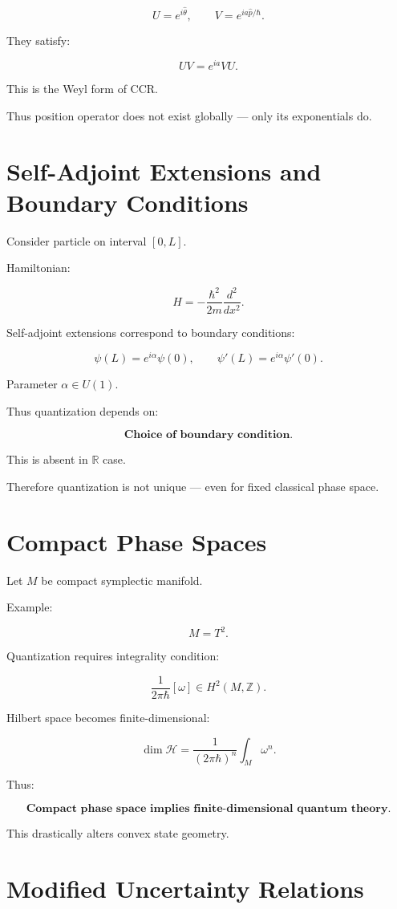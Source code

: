 \documentclass[11pt]{book}
\begin{document}
\[
U = e^{i\hat{\theta}},
\qquad
V = e^{i a \hat{p}/\hbar}.
\]

They satisfy:

\[
UV = e^{ia}VU.
\]

This is the Weyl form of CCR.

Thus position operator does not exist globally —
only its exponentials do.

\section{Self-Adjoint Extensions and Boundary Conditions}

Consider particle on interval $[0,L]$.

Hamiltonian:

\[
H = -\frac{\hbar^2}{2m}\frac{d^2}{dx^2}.
\]

Self-adjoint extensions correspond to boundary conditions:

\[
\psi(L) = e^{i\alpha}\psi(0),
\qquad
\psi'(L)=e^{i\alpha}\psi'(0).
\]

Parameter $\alpha \in U(1)$.

Thus quantization depends on:

\[
\textbf{Choice of boundary condition}.
\]

This is absent in $\mathbb{R}$ case.

Therefore quantization is not unique —
even for fixed classical phase space.

\section{Compact Phase Spaces}

Let $M$ be compact symplectic manifold.

Example:

\[
M = T^2.
\]

Quantization requires integrality condition:

\[
\frac{1}{2\pi\hbar}[\omega] \in H^2(M,\mathbb{Z}).
\]

Hilbert space becomes finite-dimensional:

\[
\dim \mathcal{H} = \frac{1}{(2\pi\hbar)^n}\int_M \omega^n.
\]

Thus:

\[
\textbf{Compact phase space implies finite-dimensional quantum theory}.
\]

This drastically alters convex state geometry.

\section{Modified Uncertainty Relations}
\end{document}

